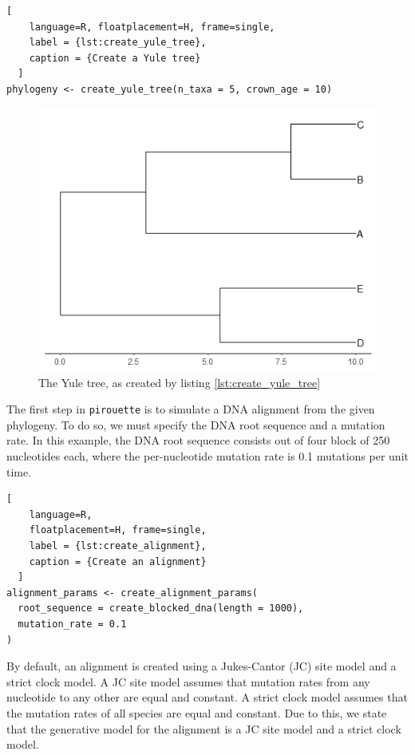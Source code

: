 \documentclass{article}
\begin{document}
\begin{lstlisting}[
    language=R, floatplacement=H, frame=single, 
    label = {lst:create_yule_tree}, 
    caption = {Create a Yule tree}
  ]
phylogeny <- create_yule_tree(n_taxa = 5, crown_age = 10)
\end{lstlisting}

\begin{figure}[h]
  \includegraphics[width=\textwidth]{figure_bd.png}
  \caption{The Yule tree, as created by listing \ref{lst:create_yule_tree}}
\end{figure}

The first step in \verb;pirouette; is to simulate a DNA alignment from the given phylogeny. 
To do so, we must specify the DNA root sequence and a mutation rate. 
In this example, the DNA root sequence consists out of four block of 250 nucleotides each, 
where the per-nucleotide mutation rate is 0.1 mutations per unit time.

\begin{lstlisting}[
    language=R,
    floatplacement=H, frame=single,
    label = {lst:create_alignment}, 
    caption = {Create an alignment}
  ]
alignment_params <- create_alignment_params(
  root_sequence = create_blocked_dna(length = 1000),
  mutation_rate = 0.1
)
\end{lstlisting}

By default, an alignment is created using a Jukes-Cantor (JC) site model
and a strict clock model. A JC site model assumes that mutation rates from any nucleotide to any other are equal and constant. A strict clock model assumes that the mutation rates of all species are equal and constant.
Due to this, we state that the generative model for the alignment is
a JC site model and a strict clock model.
\end{document}

